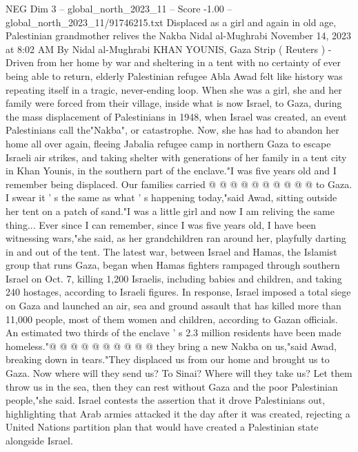 \begin{textsample}{NEG Dim 3 – global\_north\_2023\_11 – Score -1.00 – global\_north\_2023\_11/91746215.txt}  \label{ex:f3_neg_287}
Displaced as a girl and again in old age, Palestinian grandmother relives the Nakba Nidal al-Mughrabi November 14, 2023 at 8:02 AM By Nidal al-Mughrabi KHAN YOUNIS, Gaza Strip ( Reuters ) - Driven from her home by war and sheltering in a tent with no certainty of ever being able to return, elderly Palestinian refugee Abla Awad felt like history was repeating itself in a tragic, never-ending loop.
When she was a girl, she and her family were forced from their village, inside what is now Israel, to Gaza, during the mass displacement of Palestinians in 1948, when Israel was created, an event Palestinians call the"Nakba", or catastrophe.
Now, she has had to abandon her home all over again, fleeing Jabalia refugee camp in northern Gaza to escape Israeli air strikes, and taking shelter with generations of her family in a tent city in Khan Younis, in the southern part of the enclave."I was five years old and I remember being displaced.
Our families carried @ @ @ @ @ @ @ @ @ @ to Gaza.
I swear it ' s the same as what ' s happening today,"said Awad, sitting outside her tent on a patch of sand."I was a little girl and now I am reliving the same thing...
Ever since I can remember, since I was five years old, I have been witnessing wars,"she said, as her grandchildren ran around her, playfully darting in and out of the tent.
The latest war, between Israel and Hamas, the Islamist group that runs Gaza, began when Hamas fighters rampaged through southern Israel on Oct. 7, killing 1,200 Israelis, including babies and children, and taking 240 hostages, according to Israeli figures.
In response, Israel imposed a total siege on Gaza and launched an air, sea and ground assault that has killed more than 11,000 people, most of them women and children, according to Gazan officials.
An estimated two thirds of the enclave ' s 2.3 million residents have been made homeless."@ @ @ @ @ @ @ @ @ @ they bring a new Nakba on us,"said Awad, breaking down in tears."They displaced us from our home and brought us to Gaza.
Now where will they send us?
To Sinai?
Where will they take us?
Let them throw us in the sea, then they can rest without Gaza and the poor Palestinian people,"she said.
Israel contests the assertion that it drove Palestinians out, highlighting that Arab armies attacked it the day after it was created, rejecting a United Nations partition plan that would have created a Palestinian state alongside Israel.

\end{textsample}
